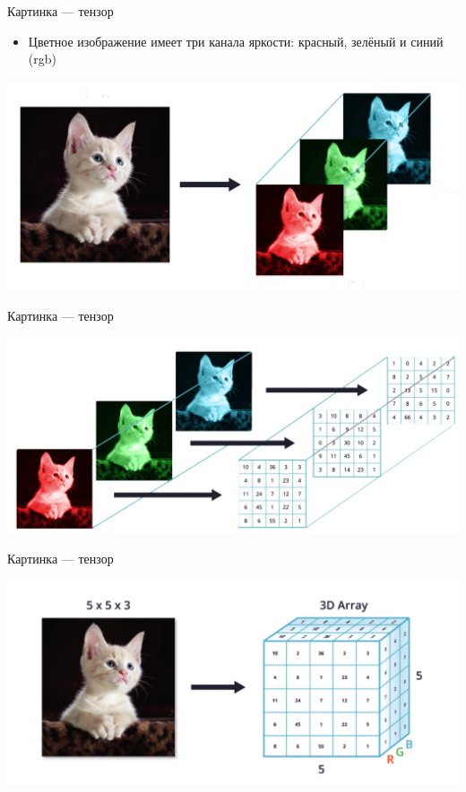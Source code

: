 \documentclass[notes,12pt, aspectratio=169]{beamer}
\begin{document}
\begin{frame}{Картинка — тензор}
\begin{itemize}
	\item Цветное изображение имеет три канала яркости: красный, зелёный и синий (rgb)
\end{itemize}

\begin{center}
\includegraphics[width=.7\linewidth]{pixels2_clean.png}
\end{center}
\end{frame}

\begin{frame}{Картинка — тензор}
\begin{center}
	\includegraphics[width=.8\linewidth]{pixels3_clean.png}
\end{center}
\end{frame}


\begin{frame}{Картинка — тензор}
\begin{center}
	\includegraphics[width=.8\linewidth]{cat_cube.png}
\end{center}
\end{frame}
\end{document}
